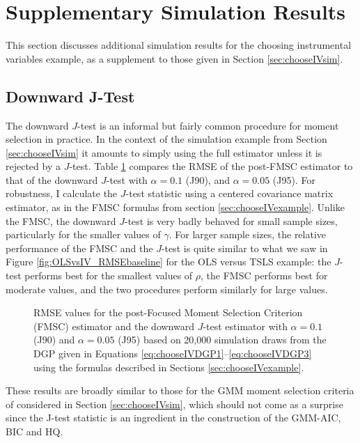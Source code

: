 \section{Supplementary Simulation Results}
\label{sec:simsupplement}
This section discusses additional simulation results for the choosing instrumental variables example, as a supplement to those given in Section \ref{sec:chooseIVsim}.

\subsection{Downward J-Test}
\label{sec:downwardJ}
The downward $J$-test is an informal but fairly common procedure for moment selection in practice.
In the context of the simulation example from Section \ref{sec:chooseIVsim} it amounts to simply using the full estimator unless it is rejected by a $J$-test.
Table \ref{fig:chooseIVsim_RMSErelJ} compares the RMSE of the post-FMSC estimator to that of the downward $J$-test with $\alpha = 0.1$ (J90), and $\alpha = 0.05$ (J95).
For robustness, I calculate the $J$-test statistic using a centered covariance matrix estimator, as in the FMSC formulas from section \ref{sec:chooseIVexample}.
Unlike the FMSC, the downward $J$-test is very badly behaved for small sample sizes, particularly for the smaller values of $\gamma$.
For larger sample sizes, the relative performance of the FMSC and the $J$-test is quite similar to what we saw in Figure \ref{fig:OLSvsIV_RMSEbaseline} for the OLS versus TSLS example: the $J$-test performs best for the smallest values of $\rho$, the FMSC performs best for moderate values, and the two procedures perform similarly for large values.
\begin{figure}
\centering
	
	\caption{RMSE values for the post-Focused Moment Selection Criterion (FMSC) estimator and the downward $J$-test estimator with $\alpha = 0.1$ (J90) and $\alpha = 0.05$ (J95) based on 20,000 simulation draws from the DGP given in Equations \ref{eq:chooseIVDGP1}--\ref{eq:chooseIVDGP3} using the formulas described in Sections \ref{sec:chooseIVexample}.}
	\label{fig:chooseIVsim_RMSErelJ}
\end{figure}
These results are broadly similar to those for the GMM moment selection criteria of \cite{Andrews1999} considered in Section \ref{sec:chooseIVsim}, which should not come as a surprise since the J-test statistic is an ingredient in the construction of the GMM-AIC, BIC and HQ. 

